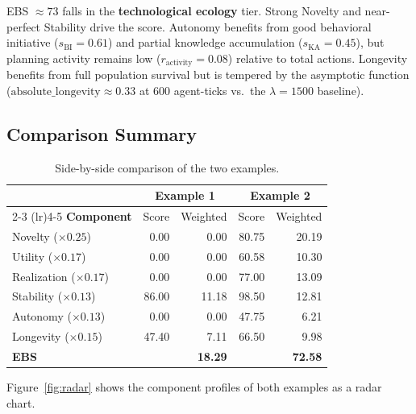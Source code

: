 \documentclass[a4paper, 11pt]{article}
\begin{document}
\begin{interpretbox}
    EBS $\approx 73$ falls in the \textbf{technological ecology} tier. Strong Novelty and near-perfect Stability drive the score. Autonomy benefits from good behavioral initiative ($s_{\text{BI}} = 0.61$) and partial knowledge accumulation ($s_{\text{KA}} = 0.45$), but planning activity remains low ($r_{\text{activity}} = 0.08$) relative to total actions. Longevity benefits from full population survival but is tempered by the asymptotic function ($\text{absolute\_longevity} \approx 0.33$ at 600 agent-ticks vs.\ the $\lambda = 1500$ baseline).
\end{interpretbox}

\subsection{Comparison Summary}

\begin{table}[ht]
\centering
\caption{Side-by-side comparison of the two examples.}
\label{tab:comparison}
\begin{tabular}{@{}l rr rr@{}}
\toprule
& \multicolumn{2}{c}{\textbf{Example 1}} & \multicolumn{2}{c}{\textbf{Example 2}} \\
\cmidrule(lr){2-3} \cmidrule(lr){4-5}
\textbf{Component} & Score & Weighted & Score & Weighted \\
\midrule
Novelty ($\times 0.25$)     &  0.00 &  0.00 & 80.75 & 20.19 \\
Utility ($\times 0.17$)     &  0.00 &  0.00 & 60.58 & 10.30 \\
Realization ($\times 0.17$) &  0.00 &  0.00 & 77.00 & 13.09 \\
Stability ($\times 0.13$)   & 86.00 & 11.18 & 98.50 & 12.81 \\
Autonomy ($\times 0.13$)    &  0.00 &  0.00 & 47.75 &  6.21 \\
Longevity ($\times 0.15$)   & 47.40 &  7.11 & 66.50 &  9.98 \\
\midrule
\textbf{EBS}                &       & \textbf{18.29} &  & \textbf{72.58} \\
\bottomrule
\end{tabular}
\end{table}

Figure~\ref{fig:radar} shows the component profiles of both examples as a radar chart.
\end{document}
